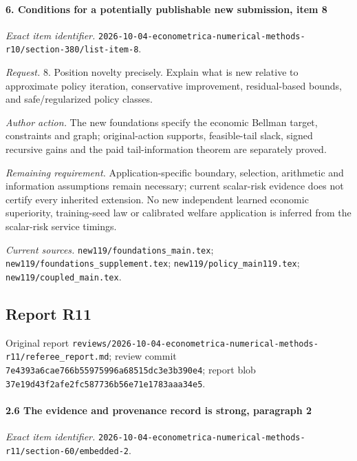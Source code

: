 \paragraph{6. Conditions for a potentially publishable new submission, item 8}

\emph{Exact item identifier.} \nolinkurl{2026-10-04-econometrica-numerical-methods-r10/section-380/list-item-8}.

\par\emph{Request.} 8. Position novelty precisely. Explain what is new relative to approximate policy iteration, conservative improvement, residual-based bounds, and safe/\allowbreak{}regularized policy classes.

\par\emph{Author action.} The new foundations specify the economic Bellman target, constraints and graph; original-action supports, feasible-tail slack, signed recursive gains and the paid tail-information theorem are separately proved.

\par\emph{Remaining requirement.} Application-specific boundary, selection, arithmetic and information assumptions remain necessary; current scalar-risk evidence does not certify every inherited extension. No new independent learned economic superiority, training-seed law or calibrated welfare application is inferred from the scalar-risk service timings.

\par\emph{Current sources.} \nolinkurl{new119/foundations_main.tex}; \nolinkurl{new119/foundations_supplement.tex}; \nolinkurl{new119/policy_main119.tex}; \nolinkurl{new119/coupled_main.tex}.

\subsection{Report R11}

Original report \nolinkurl{reviews/2026-10-04-econometrica-numerical-methods-r11/referee_report.md}; review commit \nolinkurl{7e4393a6cae766b55975996a68515dc3e3b390e4}; report blob \nolinkurl{37e19d43f2afe2fc587736b56e71e1783aaa34e5}.

\paragraph{2.6 The evidence and provenance record is strong, paragraph 2}

\emph{Exact item identifier.} \nolinkurl{2026-10-04-econometrica-numerical-methods-r11/section-60/embedded-2}.


